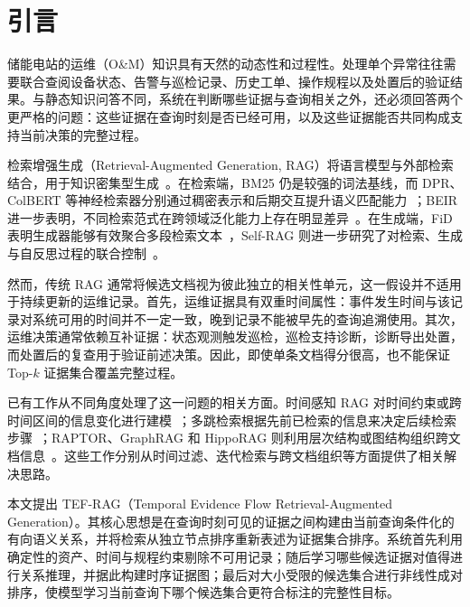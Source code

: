 \section{引言}
\label{sec:introduction}

储能电站的运维（O\&M）知识具有天然的动态性和过程性。处理单个异常往往需要联合查阅设备状态、告警与巡检记录、历史工单、操作规程以及处置后的验证结果。与静态知识问答不同，系统在判断哪些证据与查询相关之外，还必须回答两个更严格的问题：这些证据在查询时刻是否已经可用，以及这些证据能否共同构成支持当前决策的完整过程。

检索增强生成（Retrieval-Augmented Generation, RAG）将语言模型与外部检索结合，用于知识密集型生成~\cite{lewis2020rag}。在检索端，BM25 仍是较强的词法基线，而 DPR、ColBERT 等神经检索器分别通过稠密表示和后期交互提升语义匹配能力~\cite{karpukhin2020dpr,khattab2020colbert}；BEIR 进一步表明，不同检索范式在跨领域泛化能力上存在明显差异~\cite{thakur2021beir}。在生成端，FiD 表明生成器能够有效聚合多段检索文本~\cite{izacard2021fid}，Self-RAG 则进一步研究了对检索、生成与自反思过程的联合控制~\cite{asai2024selfrag}。

然而，传统 RAG 通常将候选文档视为彼此独立的相关性单元，这一假设并不适用于持续更新的运维记录。首先，运维证据具有双重时间属性：事件发生时间与该记录对系统可用的时间并不一定一致，晚到记录不能被早先的查询追溯使用。其次，运维决策通常依赖互补证据：状态观测触发巡检，巡检支持诊断，诊断导出处置，而处置后的复查用于验证前述决策。因此，即使单条文档得分很高，也不能保证 Top-$k$ 证据集合覆盖完整过程。

已有工作从不同角度处理了这一问题的相关方面。时间感知 RAG 对时间约束或跨时间区间的信息变化进行建模~\cite{zhang2025mrag,lau2025tarag}；多跳检索根据先前已检索的信息来决定后续检索步骤~\cite{xiong2021mdr,trivedi2023ircot}；RAPTOR、GraphRAG 和 HippoRAG 则利用层次结构或图结构组织跨文档信息~\cite{sarthi2024raptor,edge2024graphrag,gutierrez2024hipporag}。这些工作分别从时间过滤、迭代检索与跨文档组织等方面提供了相关解决思路。

本文提出 TEF-RAG（Temporal Evidence Flow Retrieval-Augmented Generation）。其核心思想是在查询时刻可见的证据之间构建由当前查询条件化的有向语义关系，并将检索从独立节点排序重新表述为证据集合排序。系统首先利用确定性的资产、时间与规程约束剔除不可用记录；随后学习哪些候选证据对值得进行关系推理，并据此构建时序证据图；最后对大小受限的候选集合进行非线性成对排序，使模型学习当前查询下哪个候选集合更符合标注的完整性目标。

